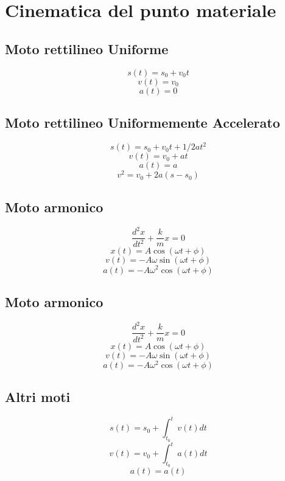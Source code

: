 \documentclass[../../dimostrazioni]{subfiles}
\begin{document}
    \chapter{Cinematica del punto materiale}

        \section*{Moto rettilineo Uniforme}
        
            \[    s(t) = s_0 + v_0 t   \]
            \[    v(t) = v_0     \]
            \[    a(t) = 0     \]   
        
        \section*{Moto rettilineo Uniformemente Accelerato}
        
            \[    s(t) = s_0 + v_0 t + 1/2 a t^2   \]
            \[    v(t) = v_0 + a t     \]
            \[    a(t) = a     \]
            \[    v^2 = v_0 + 2a(s - s_0)   \]
        
        \section*{Moto armonico}
        
            \[    \frac{d^2x}{dt^2} + \frac{k}{m}x = 0   \]
            \[    x(t) = A \cos(\omega t + \phi)     \]
            \[    v(t) = -A \omega \sin(\omega t + \phi)     \]
            \[    a(t) = -A \omega^2 \cos(\omega t + \phi)   \]
        
        \section*{Moto armonico}
        
            \[    \frac{d^2x}{dt^2} + \frac{k}{m}x = 0   \]
            \[    x(t) = A \cos(\omega t + \phi)     \]
            \[    v(t) = -A \omega \sin(\omega t + \phi)     \]
            \[    a(t) = -A \omega^2 \cos(\omega t + \phi)   \]
        
        \section*{Altri moti}
        
            \[    s(t) = s_0 + \int_{t_0}^{t} v(t) dt  \]
            \[    v(t) = v_0 + \int_{t_0}^{t} a(t) dt     \]
            \[    a(t) = a (t)     \]
        

        
\end{document}
